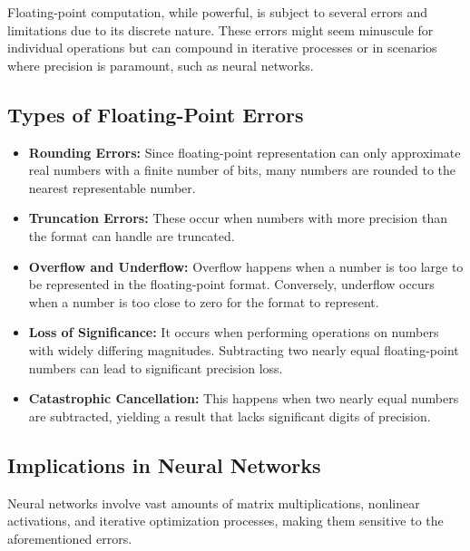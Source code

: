 Floating-point computation, while powerful, is subject to several errors and limitations due to its discrete nature. These errors might seem minuscule for individual operations but can compound in iterative processes or in scenarios where precision is paramount, such as neural networks.

\subsection{Types of Floating-Point Errors}

\begin{itemize}
	\item \textbf{Rounding Errors:} Since floating-point representation can only approximate real numbers with a finite number of bits, many numbers are rounded to the nearest representable number.
	
	\item \textbf{Truncation Errors:} These occur when numbers with more precision than the format can handle are truncated.
	
	\item \textbf{Overflow and Underflow:} Overflow happens when a number is too large to be represented in the floating-point format. Conversely, underflow occurs when a number is too close to zero for the format to represent.
	
	\item \textbf{Loss of Significance:} It occurs when performing operations on numbers with widely differing magnitudes. Subtracting two nearly equal floating-point numbers can lead to significant precision loss.
	
	\item \textbf{Catastrophic Cancellation:} This happens when two nearly equal numbers are subtracted, yielding a result that lacks significant digits of precision.
\end{itemize}

\subsection{Implications in Neural Networks}

Neural networks involve vast amounts of matrix multiplications, nonlinear activations, and iterative optimization processes, making them sensitive to the aforementioned errors.

